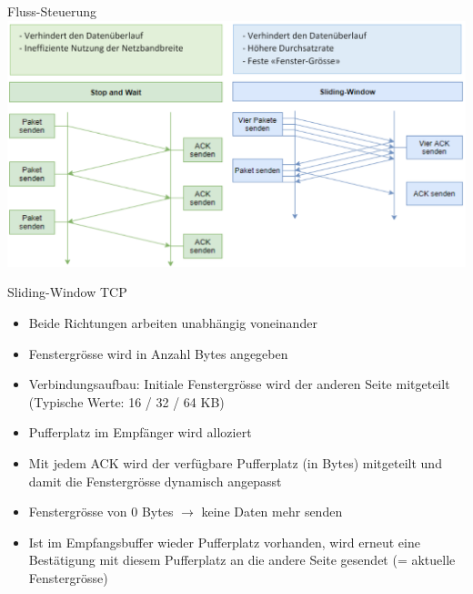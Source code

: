 \begin{concept}{Fluss-Steuerung}\\
        \includegraphics[width=1\linewidth]{images/fluss-steuerung.png}
\end{concept}





\begin{KR}{Sliding-Window TCP}
    \begin{itemize}
        \item Beide Richtungen arbeiten unabhängig voneinander
        \item Fenstergrösse wird in Anzahl Bytes angegeben
        \item Verbindungsaufbau: Initiale Fenstergrösse wird der anderen Seite mitgeteilt (Typische Werte: 16 / 32 / 64 KB)
        \item Pufferplatz im Empfänger wird alloziert
        \item Mit jedem ACK wird der verfügbare Pufferplatz (in Bytes) mitgeteilt und damit die Fenstergrösse dynamisch angepasst
        \item Fenstergrösse von 0 Bytes $\rightarrow$ keine Daten mehr senden
        \item Ist im Empfangsbuffer wieder Pufferplatz vorhanden, wird erneut eine Bestätigung mit diesem Pufferplatz an die andere Seite gesendet (= aktuelle Fenstergrösse)
    \end{itemize}
\end{KR}



